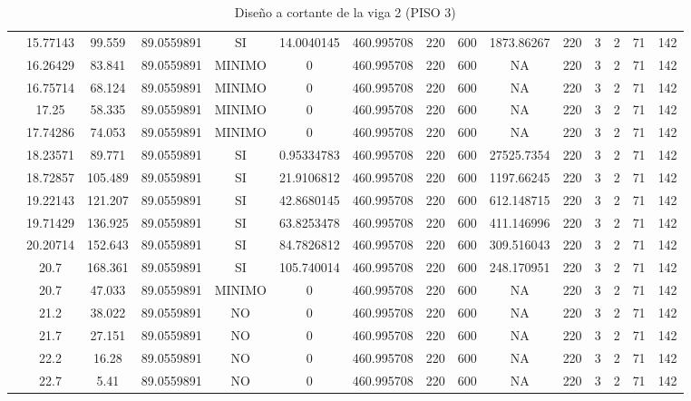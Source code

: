 \begin{table}[H]
{\begin{tabular}{|c|c|c|c|c|c|c|c|c|c|c|c|c|c|c|}
\cline{2-15}    & 15.77143 & 99.559 & 89.0559891 & SI  & 14.0040145 & 460.995708 & 220 & 600 & 1873.86267 & 220 & 3   & 2   & 71  & 142 \bigstrut\\
\cline{2-15}    & 16.26429 & 83.841 & 89.0559891 & MINIMO & 0   & 460.995708 & 220 & 600 & NA  & 220 & 3   & 2   & 71  & 142 \bigstrut\\
\cline{2-15}    & 16.75714 & 68.124 & 89.0559891 & MINIMO & 0   & 460.995708 & 220 & 600 & NA  & 220 & 3   & 2   & 71  & 142 \bigstrut\\
\cline{2-15}    & 17.25 & 58.335 & 89.0559891 & MINIMO & 0   & 460.995708 & 220 & 600 & NA  & 220 & 3   & 2   & 71  & 142 \bigstrut\\
\cline{2-15}    & 17.74286 & 74.053 & 89.0559891 & MINIMO & 0   & 460.995708 & 220 & 600 & NA  & 220 & 3   & 2   & 71  & 142 \bigstrut\\
\cline{2-15}    & 18.23571 & 89.771 & 89.0559891 & SI  & 0.95334783 & 460.995708 & 220 & 600 & 27525.7354 & 220 & 3   & 2   & 71  & 142 \bigstrut\\
\cline{2-15}    & 18.72857 & 105.489 & 89.0559891 & SI  & 21.9106812 & 460.995708 & 220 & 600 & 1197.66245 & 220 & 3   & 2   & 71  & 142 \bigstrut\\
\cline{2-15}    & 19.22143 & 121.207 & 89.0559891 & SI  & 42.8680145 & 460.995708 & 220 & 600 & 612.148715 & 220 & 3   & 2   & 71  & 142 \bigstrut\\
\cline{2-15}    & 19.71429 & 136.925 & 89.0559891 & SI  & 63.8253478 & 460.995708 & 220 & 600 & 411.146996 & 220 & 3   & 2   & 71  & 142 \bigstrut\\
\cline{2-15}    & 20.20714 & 152.643 & 89.0559891 & SI  & 84.7826812 & 460.995708 & 220 & 600 & 309.516043 & 220 & 3   & 2   & 71  & 142 \bigstrut\\
\cline{2-15}    & 20.7 & 168.361 & 89.0559891 & SI  & 105.740014 & 460.995708 & 220 & 600 & 248.170951 & 220 & 3   & 2   & 71  & 142 \bigstrut\\
\cline{2-15}    & 20.7 & 47.033 & 89.0559891 & MINIMO & 0   & 460.995708 & 220 & 600 & NA  & 220 & 3   & 2   & 71  & 142 \bigstrut\\
\cline{2-15}    & 21.2 & 38.022 & 89.0559891 & NO  & 0   & 460.995708 & 220 & 600 & NA  & 220 & 3   & 2   & 71  & 142 \bigstrut\\
\cline{2-15}    & 21.7 & 27.151 & 89.0559891 & NO  & 0   & 460.995708 & 220 & 600 & NA  & 220 & 3   & 2   & 71  & 142 \bigstrut\\
\cline{2-15}    & 22.2 & 16.28 & 89.0559891 & NO  & 0   & 460.995708 & 220 & 600 & NA  & 220 & 3   & 2   & 71  & 142 \bigstrut\\
\cline{2-15}    & 22.7 & 5.41 & 89.0559891 & NO  & 0   & 460.995708 & 220 & 600 & NA  & 220 & 3   & 2   & 71  & 142 \bigstrut\\
\hline
\end{tabular}%


  

  }%
    \caption{Diseño a cortante de la viga 2 (PISO 3) }
  \label{tab:C VG2 P3 }%
\end{table}%
